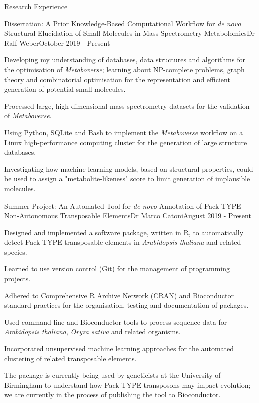 \documentclass{resume}
\begin{document}
\begin{rSection}{Research Experience}

\begin{rSubsection}{Dissertation: A Prior Knowledge-Based Computational Workflow for \textit{de novo} Structural Elucidation of Small Molecules in Mass Spectrometry Metabolomics}{}{Dr Ralf Weber}{October 2019 - Present}

\item Developing my understanding of databases, data structures and algorithms for the optimisation of \textit{Metaboverse}; learning about NP-complete problems, graph theory and combinatorial optimisation for the representation and efficient generation of potential small molecules. 
\item Processed large, high-dimensional mass-spectrometry datasets for the validation of \textit{Metaboverse}. 
\item Using Python, SQLite and Bash to implement the \textit{Metaboverse} workflow  on a Linux high-performance computing cluster for the generation of large structure databases.
\item Investigating how machine learning models, based on structural properties, could be used to assign a "metabolite-likeness" score to limit generation of implausible molecules. 
\end{rSubsection}

\begin{rSubsection}{Summer Project: An Automated Tool for \textit{de novo} Annotation of Pack-TYPE Non-Autonomous Transposable Elements}{}{Dr Marco Catoni}{August 2019 - Present}

\item Designed and implemented a software package, written in R, to automatically detect Pack-TYPE transposable elements in \textit{Arabidopsis thaliana} and related species. 
\item Learned to use version control (Git) for the management of programming projects.
\item Adhered to Comprehensive R Archive Network (CRAN) and Bioconductor standard practices for the organisation, testing and documentation of packages.
\item Used command line and Bioconductor tools to process sequence data for \textit{Arabidopsis thaliana}, \textit{Oryza sativa} and related organisms.
\item Incorporated unsupervised machine learning approaches for the automated clustering of related transposable elements.
\item The package is currently being used by geneticists at the University of Birmingham to understand how Pack-TYPE transposons may impact evolution; we are currently in the process of publishing the tool to Bioconductor.
\end{rSubsection}


\end{rSection}
\end{document}
